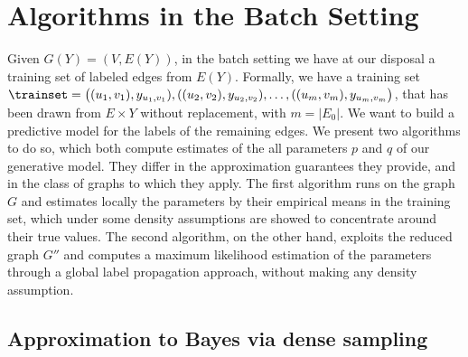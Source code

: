 \section{Algorithms in the Batch Setting}\label{s:algbatch}

Given $G(Y) =(V,E(Y))$, in the batch setting we have at our disposal a training set \trainset{} of
labeled edges from $E(Y)$. Formally, we have a training set $\trainset
= \big((u_1,v_1),y_{u_1,v_1}), ((u_2,v_2),y_{u_2,v_2}), \ldots, ((u_m,v_m),y_{u_m,v_m}\big)$, that
has been drawn from $E\times Y$ \uar{} without replacement, with
$m = |E_0|$. We want to build a predictive model for the labels of the remaining
edges. We present two algorithms to do so, which both compute estimates of the all parameters $p$
and $q$ of our generative model. They differ in the approximation guarantees they provide, and in
the class of graphs to which they apply. The first algorithm runs on the graph $G$ and estimates
locally the parameters by their empirical means in the training set, which under some density
assumptions are showed to concentrate around their true values. The second algorithm, on the other
hand, exploits the reduced graph $G''$ and computes a maximum likelihood estimation of the
parameters through a global label propagation approach, without making any density assumption.

\subsection{Approximation to Bayes via dense sampling}\label{ss:bayes_approx}

